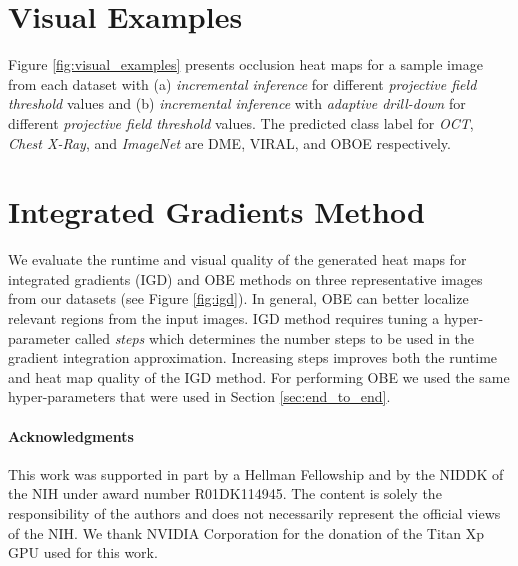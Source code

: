 \section{Visual Examples}\label{sec:visual_examples}

Figure \ref{fig:visual_examples} presents occlusion heat maps for a sample image from each dataset with (a) \textit{incremental inference} for different \textit{projective field threshold} values and (b) \textit{incremental inference} with \textit{adaptive drill-down} for different \textit{projective field threshold} values. The predicted class label for \textit{OCT}, \textit{Chest X-Ray}, and \textit{ImageNet} are DME, VIRAL, and OBOE respectively.


\section{Integrated Gradients Method}\label{sec:igd}
We evaluate the runtime and visual quality of the generated heat maps for integrated gradients (IGD) \cite{sundararajan2017axiomatic} and OBE methods on three representative images from our datasets (see Figure \ref{fig:igd}).
In general, OBE can better localize relevant regions from the input images.
IGD method requires tuning a hyper-parameter called \textit{steps} which determines the number steps to be used in the gradient integration approximation.
Increasing steps improves both the runtime and heat map quality of the IGD method.
For performing OBE we used the same hyper-parameters that were used in Section \ref{sec:end_to_end}.

\paragraph*{Acknowledgments} This work was supported in part by a Hellman Fellowship and by the NIDDK of the NIH under award number R01DK114945. The content is solely the responsibility of the authors and does not necessarily represent the official views of the NIH. We thank NVIDIA Corporation for the donation of the Titan Xp GPU used for this work.
